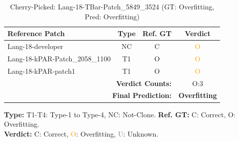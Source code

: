 \begin{table}[t]
\centering
\caption{Cherry-Picked: Lang-18-TBar-Patch\_5849\_3524 (GT: Overfitting, Pred: Overfitting)}
\label{tab:cherry-Lang18TBarPatch58493524}
\footnotesize
\renewcommand{\arraystretch}{1.1}
\setlength{\tabcolsep}{4pt}
\begin{tabular}{l|c|c|c}
\hline
\textbf{Reference Patch} & \textbf{Type} & \textbf{Ref. GT} & \textbf{Verdict} \\
\hline
Lang-18-developer & NC & C & \textcolor{orange}{O} \\
Lang-18-kPAR-Patch\_2058\_1100 & T1 & O & \textcolor{orange}{O} \\
Lang-18-kPAR-patch1 & T1 & O & \textcolor{orange}{O} \\
\hline
\multicolumn{3}{r|}{\textbf{Verdict Counts:}} & O:3 \\
\multicolumn{3}{r|}{\textbf{Final Prediction:}} & \textbf{Overfitting} \\
\hline
\end{tabular}
\vspace{1mm}
\parbox{\linewidth}{\centering\footnotesize 
\vspace{1mm}
\textbf{Type:} T1-T4: Type-1 to Type-4, NC: Not-Clone. \;
\textbf{Ref. GT:} C: Correct, O: Overfitting. \\
\textbf{Verdict:} \textcolor{green!60!black}{C}: Correct, \textcolor{orange}{O}: Overfitting, \textcolor{gray}{U}: Unknown.}
\end{table}


